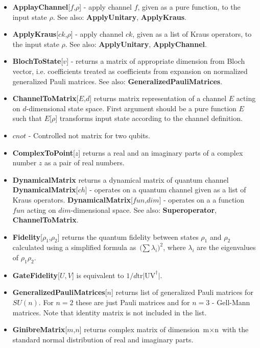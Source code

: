 \documentclass[a4paper,10pt]{scrartcl}
\begin{document}
\begin{itemize} 
\item  \textbf{ApplayChannel}[$f$,$\rho$] - apply channel $f$, given as a pure function, to the input state $\rho$. See also: \textbf{ApplyUnitary}, \textbf{ApplyKraus}.
\item  \textbf{ApplyKraus}[$ck$,$\rho$] - apply channel $ck$, given as a list of Kraus operators, to the input state $\rho$. See also: \textbf{ApplyUnitary}, \textbf{ApplyChannel}.
\item  \textbf{BlochToState}[$v$] - returns a matrix of appropriate dimension from Bloch vector, i.e. coefficients treated as coefficients from expansion on normalized generalized Pauli matrices. See also: \textbf{GeneralizedPauliMatrices}.
\item  \textbf{ChannelToMatrix}[$E$,$d$] returns matrix representation of a channel $E$ acting on $d$-dimensional state space. First argument should be a pure function $E$ such that $E$[$\rho$] transforms input state according to the channel definition.
\item  $cnot$ - Controlled not matrix for two qubits.
\item  \textbf{ComplexToPoint}[$z$] returns a real and an imaginary parts of a complex number $z$ as a pair of real numbers.
\item  \textbf{DynamicalMatrix} returns a dynamical matrix of quantum channel\newline{}
\textbf{DynamicalMatrix}[$ch$] -  operates on a quantum channel given as a list of Kraus operators.\newline{}
\textbf{DynamicalMatrix}[$fun$,$dim$]  - operates on a a function $fun$ acting on $dim$-dimensional space. \newline{}
See also: \textbf{Superoperator}, \textbf{ChannelToMatrix}.
\item  \textbf{Fidelity}[$\rho _1$,$\rho _2$] returns the quantum fidelity between states $\rho _1$ and $\rho _2$ calculated using a simplified formula as $\text{($\sum $}\lambda _i)^2$, where $\lambda _i$ are the eigenvalues of $\rho _1\rho _2$.
\item  \textbf{GateFidelity}[$U,V$] is equivalent to $1/d\text{tr$|$UV} ^{\dagger }|$.
\item  \textbf{GeneralizedPauliMatrices}[$n$] returns list of generalized Pauli matrices for $SU(n)$. For $n=2$ these are just Pauli matrices and for $n=3$ - Gell-Mann matrices. Note that identity matrix is not included in the list.
\item  \textbf{GinibreMatrix}[$m$,$n$] returns complex matrix of dimension $\text{m$\times $n}$ with the standard normal distribution of real and imaginary parts.

\end{itemize}
\end{document}
